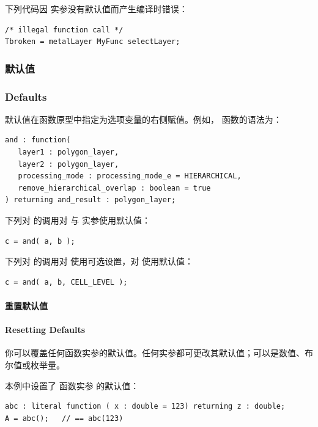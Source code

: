 下列代码因  实参没有默认值而产生编译时错误：
\begin{lstlisting}[style=pxl]
/* illegal function call */
Tbroken = metalLayer MyFunc selectLayer;
\end{lstlisting}

\subsubsection{默认值}
\subsubsection*{Defaults}

默认值在函数原型中指定为选项变量的右侧赋值。例如， 函数的语法为：
\begin{lstlisting}[style=pxl]
and : function(
   layer1 : polygon_layer,
   layer2 : polygon_layer,
   processing_mode : processing_mode_e = HIERARCHICAL,
   remove_hierarchical_overlap : boolean = true
) returning and_result : polygon_layer;
\end{lstlisting}

下列对  的调用对  与  实参使用默认值：
\begin{lstlisting}[style=pxl]
c = and( a, b );
\end{lstlisting}

下列对  的调用对  使用可选设置，对  使用默认值：
\begin{lstlisting}[style=pxl]
c = and( a, b, CELL_LEVEL );
\end{lstlisting}

\paragraph{重置默认值}
\paragraph*{Resetting Defaults}

你可以覆盖任何函数实参的默认值。任何实参都可更改其默认值；可以是数值、布尔值或枚举量。

本例中设置了  函数实参  的默认值：
\begin{lstlisting}[style=pxl]
abc : literal function ( x : double = 123) returning z : double;
A = abc();   // == abc(123)
\end{lstlisting}

